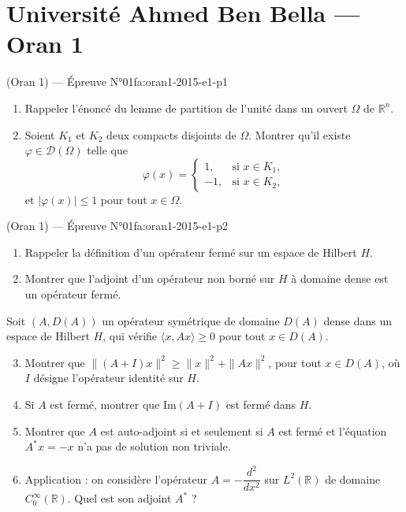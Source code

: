 \section{Université Ahmed Ben Bella --- Oran 1}
\begin{problem}{(Oran 1) — Épreuve N°01}{fa:oran1-2015-e1-p1}
\begin{enumerate}\item Rappeler l'énoncé du lemme de partition de l'unité dans un ouvert $\Omega$ de $\mathbb{R}^n$.\item Soient $K_1$ et $K_2$ deux compacts disjoints de $\Omega$. Montrer qu'il existe $\varphi\in\mathcal{D}(\Omega)$ telle que
$$\varphi(x)=\begin{cases}1, & \text{si } x\in K_1,\\ -1, & \text{si } x\in K_2,\end{cases}$$
et $|\varphi(x)|\leq1$ pour tout $x\in\Omega$.\end{enumerate}
\end{problem}
\newpage
\begin{problem}{(Oran 1) — Épreuve N°01}{fa:oran1-2015-e1-p2}
\begin{enumerate}\item Rappeler la définition d'un opérateur fermé sur un espace de Hilbert $H$.\item Montrer que l'adjoint d'un opérateur non borné sur $H$ à domaine dense est un opérateur fermé.\end{enumerate}
Soit $(A,D(A))$ un opérateur symétrique de domaine $D(A)$ dense dans un espace de Hilbert $H$, qui vérifie $\langle x,Ax\rangle\geq0$ pour tout $x\in D(A)$.
\begin{enumerate}\setcounter{enumi}{2}\item Montrer que $\|(A+I)x\|^2\geq\|x\|^2+\|Ax\|^2$, pour tout $x\in D(A)$, où $I$ désigne l'opérateur identité sur $H$.\item Si $A$ est fermé, montrer que $\mathrm{Im}(A+I)$ est fermé dans $H$.\item Montrer que $A$ est auto-adjoint si et seulement si $A$ est fermé et l'équation $A^*x=-x$ n'a pas de solution non triviale.\item Application : on considère l'opérateur $A=-\dfrac{d^2}{dx^2}$ sur $L^2(\mathbb{R})$ de domaine $C_0^{\infty}(\mathbb{R})$. Quel est son adjoint $A^*$ ?\end{enumerate}
\end{problem}
\newpage

